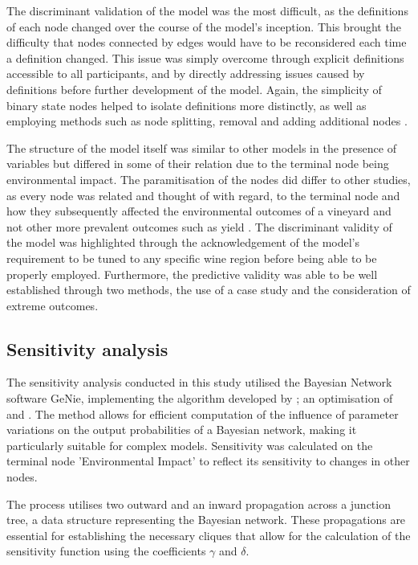 The discriminant validation of the model was the most difficult, as the definitions of each node changed over the course of the model's inception. This brought the difficulty that nodes connected by edges would have to be reconsidered each time a definition changed. This issue was simply overcome through explicit definitions accessible to all participants, and by directly addressing issues caused by definitions before further development of the model. Again, the simplicity of binary state nodes helped to isolate definitions more distinctly, as well as employing methods such as node splitting, removal and adding additional nodes \citep{korbBayesianArtificialIntelligence2011}.

The structure of the model itself was similar to other models in the presence of variables but differed in some of their relation due to the terminal node being environmental impact. The paramitisation of the nodes did differ to other studies, as every node was related and thought of with regard, to the terminal node and how they subsequently affected the environmental outcomes of a vineyard and not other more prevalent outcomes such as yield \citep{laurentReviewIssuesMethods2021}. The discriminant validity of the model was highlighted through the acknowledgement of the model's requirement to be tuned to any specific wine region before being able to be properly employed. Furthermore, the predictive validity was able to be well established through two methods, the use of a case study and the consideration of extreme outcomes.

\subsection{Sensitivity analysis}

The sensitivity analysis conducted in this study utilised the Bayesian Network software GeNie, implementing the algorithm developed by \cite{article}; an optimisation of \autocite{Castillo1996ANM} and \cite{Gaag1998PracticableSA}. The method allows for efficient computation of the influence of parameter variations on the output probabilities of a Bayesian network, making it particularly suitable for complex models. Sensitivity was calculated on the terminal node 'Environmental Impact' to reflect its sensitivity to changes in other nodes.

The process utilises two outward and an inward propagation across a junction tree, a data structure representing the Bayesian network. These propagations are essential for establishing the necessary cliques that allow for the calculation of the sensitivity function using the coefficients $\gamma$ and $\delta$.

